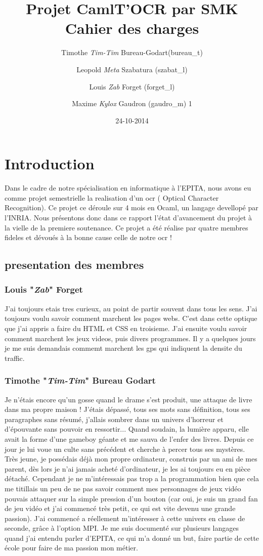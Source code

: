 \documentclass[12pt]{article}
\title{Projet CamlT'OCR par SMK \\ Cahier des charges}
\date{24-10-2014}
\author{
    Timothe \textit{Tim-Tim} Bureau-Godart(bureau\_t) \and
        Leopold \textit{Meta} Szabatura (szabat\_l) \and
        Louis \textit{Zab} Forget (forget\_l) \and
        Maxime \textit{Kylox} Gaudron (gaudro\_m)
        1      }
\begin{document}
\maketitle
\newpage
\tableofcontents
\newpage
\section{Introduction}
Dans le cadre de notre spécialisation en informatique à l'EPITA, nous avons eu comme projet semestrielle la realisation d'un ocr ( Optical Character Recognition). Ce projet ce déroule sur 4 mois en Ocaml, un langage devellopé par l'INRIA. Nous présentons donc dans ce rapport l'état d'avancement du projet à la vielle de la premiere soutenance. Ce projet a été réalise par quatre membres fideles et dévoués à la bonne cause celle de notre ocr ! 
\subsection{presentation des membres}
\subsubsection{Louis "\textit{Zab}" Forget}
J'ai toujours etais tres curieux, au point de partir souvent dans tous les sens. J'ai toujours voulu savoir comment marchent les pages webs. C'est dans cette optique que j'ai appris a faire du HTML et CSS en troisieme. J'ai ensuite voulu savoir comment marchent les jeux videos, puis divers programmes. Il y a quelques jours je me suis demandais commemt marchent les gps qui indiquent la densite du traffic.
\subsubsection{Timothe "\textit{Tim-Tim}" Bureau Godart}
Je n'étais encore qu'un gosse quand le drame s'est produit, une attaque de livre dans ma propre maison ! J'étais dépassé, tous ses mots sans définition, tous ses paragraphes sans résumé, j'allais sombrer dans un univers d'horreur et d'épouvante sans pouvoir en ressortir... Quand soudain, la lumière apparu, elle avait la forme d'une gameboy géante et me sauva de l'enfer des livres. Depuis ce jour je lui voue un culte sans précédent et cherche à percer tous ses mystères.
Très jeune, je possédais déjà mon propre ordinateur, construis par un ami de mes parent, dès lors je n'ai jamais acheté d'ordinateur, je les ai toujours eu en pièce détaché. Cependant je ne m'intéressais pas trop a la programmation bien que cela me titillais un peu de ne pas savoir comment mes personnages de jeux vidéo pouvais attaquer sur la simple pression d'un bouton (car oui, je suis un grand fan de jeu vidéo et j'ai commencé très petit, ce qui est vite devenu une grande passion). J'ai commencé a réellement m'intéresser à cette univers en classe de seconde, grâce à l'option MPI. Je me suis documenté sur plusieurs langages quand j'ai entendu parler d'EPITA, ce qui m'a donné un but, faire partie de cette école pour faire de ma passion mon métier.
\end{document}
